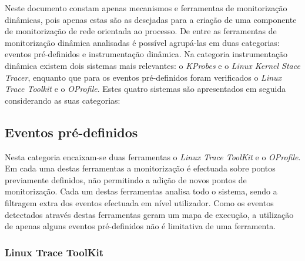 Neste documento constam apenas mecanismos e ferramentas de monitorização dinâmicas, pois apenas estas são as desejadas para a criação de uma componente de monitorização de rede orientada ao processo.
De entre as ferramentas de monitorização dinâmica analisadas é possível agrupá-las em duas categorias: eventos pré-definidos e instrumentação dinâmica.
Na categoria instrumentação dinâmica existem dois sistemas mais relevantes: o \textit{KProbes} e o \textit{Linux Kernel Stace Tracer}, enquanto que para os eventos pré-definidos foram verificados o \textit{Linux Trace Toolkit} e o \textit{OProfile}.
Estes quatro sistemas são apresentados em seguida considerando as suas categorias:

\subsection{Eventos pré-definidos}

Nesta categoria encaixam-se duas ferramentas o \textit{Linux Trace ToolKit} e o \textit{OProfile}.
Em cada uma destas ferramentas a monitorização é efectuada sobre pontos previamente definidos, não permitindo a adição de novos pontos de monitorização.
Cada um destas ferramentas analisa todo o sistema, sendo a filtragem extra dos eventos efectuada em nível utilizador.
Como os eventos detectados através destas ferramentas geram um mapa de execução, a utilização de apenas alguns eventos pré-definidos não é limitativa de uma ferramenta.

\subsubsection{Linux Trace ToolKit}\label{cap:linux_trace_toolkit_overview}


